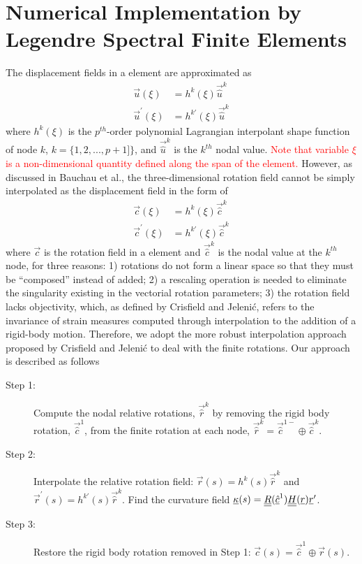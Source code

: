 \section{Numerical Implementation by Legendre Spectral Finite Elements}
The displacement fields in a element are approximated as
\begin{align}
    \label{InterpolateDisp}
    \vec{u}(\xi) &= h^k(\xi) \vec{\hat{u}}^k \\
    \label{InterpolateDispp}
    \vec{u}^\prime(\xi) &= h^{k\prime}(\xi) \vec{\hat{u}}^k
\end{align}
where $h^k(\xi)$ is the $p^{th}$-order polynomial
Lagrangian interpolant shape function of node $k$, $k=\{1,2,...,p+1]\}$, 
and $\vec{\hat{u}}^k$ is
the $k^{th}$ nodal value. \textcolor{red}{Note that variable $\xi$ is a non-dimensional quantity defined along the span of the element.}
However, as discussed in Bauchau et al.\cite{Bauchau-etal:2009}, the three-dimensional rotation field cannot be
simply interpolated as the displacement field in the form of
\begin{align}
    \label{InterpolateRot}
    \vec{c}(\xi) &= h^k(\xi) \vec{\hat{c}}^k \\
    \label{InterpolateRotp}
    \vec{c}^\prime(\xi) &= h^{k \prime}(\xi) \vec{\hat{c}}^k 
\end{align}    
where $\vec{c}$ is the rotation field in a element and $\vec{\hat{c}}^k$ is
the nodal value at the $k^{th}$ node, for three reasons: 1) rotations do not
form a linear space so that they must be  ``composed'' instead of added; 2)
a rescaling operation is needed to eliminate the singularity existing in the
vectorial rotation parameters; 3) the rotation field lacks objectivity,
which, as
defined by Crisfield and Jeleni\'c\cite{Crisfield1999}, refers to the
invariance of strain measures computed through interpolation to the addition
of a rigid-body motion. Therefore, we adopt the more robust interpolation
approach proposed by Crisfield and Jeleni\'c \cite{Crisfield1999} to deal
with the finite rotations. Our approach is described as follows
\begin{description}
    \item[Step 1:] Compute the nodal relative rotations, $\vec{\hat{r}}^k$ by removing the rigid body rotation, $\vec{\hat{c}}^1$, from the finite rotation at each node, $\vec{\hat{r}}^k = \vec{\hat{c}}^{1-} \oplus \vec{\hat{c}}^k$.
    \item[Step 2:] Interpolate the relative rotation field: $\vec{r}(s) = h^k(s) \vec{\hat{r}}^k$ and $\vec{r}^\prime(s) = h^{k \prime}(s) \vec{\hat{r}}^k$. Find the curvature field $\underline{\kappa}(s) = \underline{\underline{R}}(\underline{\hat{c}}^1) \underline{\underline{H}}(\underline{r}) \underline{r}^\prime$.
    \item[Step 3:] Restore the rigid body rotation removed in Step 1: $\vec{c}(s) = \vec{\hat{c}}^1 \oplus \vec{r}(s)$.
\end{description} 
